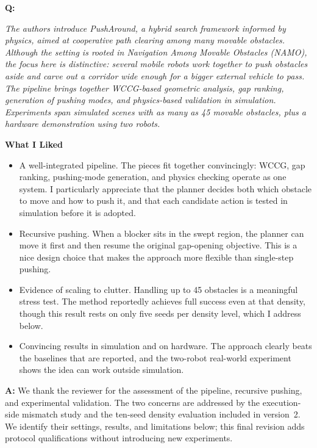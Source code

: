 \documentclass[11pt]{article}
\begin{document}
\begin{shaded*}
\noindent \textbf{Q:}
{\itshape
The authors introduce PushAround, a hybrid search framework informed by
physics, aimed at cooperative path clearing among many movable
obstacles. Although the setting is rooted in Navigation Among Movable
Obstacles (NAMO), the focus here is distinctive: several mobile robots
work together to push obstacles aside and carve out a corridor wide
enough for a bigger external vehicle to pass. The pipeline brings
together WCCG-based geometric analysis, gap ranking, generation of
pushing modes, and physics-based validation in simulation. Experiments
span simulated scenes with as many as 45 movable obstacles, plus a
hardware demonstration using two robots.


\textbf{What I Liked}
\begin{itemize}
\item A well-integrated pipeline.
The pieces fit together convincingly: WCCG, gap ranking, pushing-mode
generation, and physics checking operate as one system. I particularly
appreciate that the planner decides both which obstacle to move and how
to push it, and that each candidate action is tested in simulation
before it is adopted.

\item Recursive pushing.
When a blocker sits in the swept region, the planner can move it first
and then resume the original gap-opening objective. This is a nice
design choice that makes the approach more flexible than single-step
pushing.

\item Evidence of scaling to clutter.
Handling up to 45 obstacles is a meaningful stress test. The method
reportedly achieves full success even at that density, though this
result rests on only five seeds per density level, which I address
below.

\item Convincing results in simulation and on hardware.
The approach clearly beats the baselines that are reported, and the
two-robot real-world experiment shows the idea can work outside
simulation.
\end{itemize}
}
\end{shaded*}

\noindent \textbf{A:}
We thank the reviewer for the assessment of the pipeline, recursive pushing,
and experimental validation. The two concerns are addressed by the
execution-side mismatch study and the ten-seed density evaluation included in
version~2. We identify their settings, results, and limitations below; this
final revision adds protocol qualifications without introducing new experiments.
\end{document}
